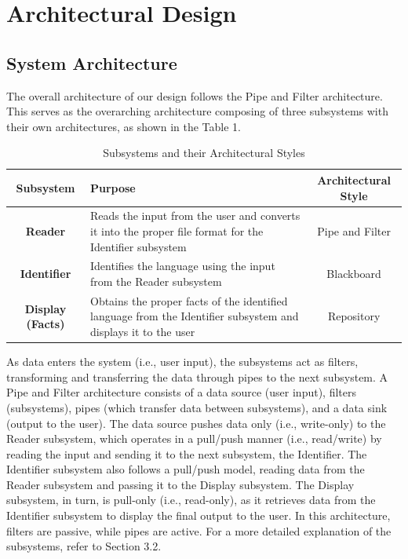 \section{Architectural Design }
\label{sec:architectural_design}

\subsection{System Architecture}
\label{sub:system_architecture}
The overall architecture of our design follows the Pipe and Filter architecture. This serves as the overarching architecture composing of three subsystems with their own architectures, as shown in the Table 1.

\begin{table}[h]
    \centering
    \renewcommand{\arraystretch}{1.5}
    \begin{tabular}{|c|p{8cm}|c|}
        \hline
        \textbf{Subsystem} & \textbf{Purpose} & \textbf{Architectural Style} \\
        \hline
        \textbf{Reader} & Reads the input from the user and converts it into the proper file format for the Identifier subsystem & Pipe and Filter \\
        \hline
        \textbf{Identifier} & Identifies the language using the input from the Reader subsystem & Blackboard \\
        \hline
        \textbf{Display (Facts)} & Obtains the proper facts of the identified language from the Identifier subsystem and displays it to the user & Repository \\
        \hline
    \end{tabular}
    \caption{Subsystems and their Architectural Styles}
    \label{tab:subsystems}
\end{table}

\noindent
As data enters the system (i.e., user input), the subsystems act as filters, transforming and transferring the data through pipes to the next subsystem. A Pipe and Filter architecture consists of a data source (user input), filters (subsystems), pipes (which transfer data between subsystems), and a data sink (output to the user).
The data source pushes data only (i.e., write-only) to the Reader subsystem, which operates in a pull/push manner (i.e., read/write) by reading the input and sending it to the next subsystem, the Identifier. The Identifier subsystem also follows a pull/push model, reading data from the Reader subsystem and passing it to the Display subsystem. The Display subsystem, in turn, is pull-only (i.e., read-only), as it retrieves data from the Identifier subsystem to display the final output to the user.
In this architecture, filters are passive, while pipes are active. For a more detailed explanation of the subsystems, refer to Section 3.2.

